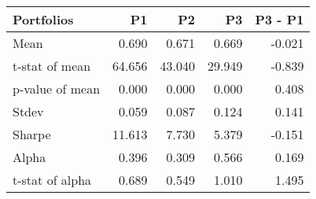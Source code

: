 \begin{tabular}{lrrrr}
\toprule
Portfolios & P1 & P2 & P3 & P3 - P1 \\
\midrule
Mean & 0.690 & 0.671 & 0.669 & -0.021 \\
t-stat of mean & 64.656 & 43.040 & 29.949 & -0.839 \\
p-value of mean & 0.000 & 0.000 & 0.000 & 0.408 \\
Stdev & 0.059 & 0.087 & 0.124 & 0.141 \\
Sharpe & 11.613 & 7.730 & 5.379 & -0.151 \\
Alpha & 0.396 & 0.309 & 0.566 & 0.169 \\
t-stat of alpha & 0.689 & 0.549 & 1.010 & 1.495 \\
\bottomrule
\end{tabular}
